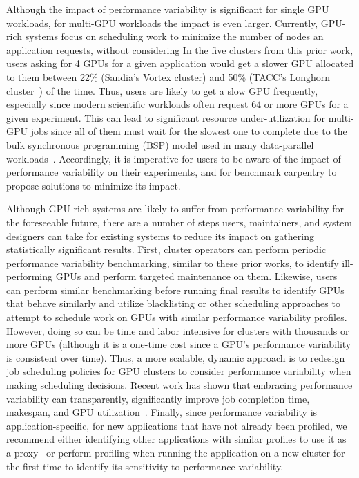 Although the impact of performance variability is significant for single GPU workloads, for multi-GPU workloads the impact is even larger.
Currently, GPU-rich systems focus on scheduling work to minimize the number of nodes an application requests, without considering 
In the five clusters from this prior work, users asking for 4 GPUs for a given application would get a slower GPU allocated to them between 22\% (Sandia's Vortex cluster) and 50\% (TACC's Longhorn cluster~\cite{stanzione2020frontera, tacc}) of the time.
Thus, users are likely to get a slow GPU frequently, especially since modern scientific workloads often request 64 or more GPUs for a given experiment.
This can lead to significant resource under-utilization for multi-GPU jobs since all of them must wait for the slowest one to complete due to the bulk synchronous programming (BSP) model used in many data-parallel workloads~\cite{paszke2017-pytorch}.
Accordingly, it is imperative for users to be aware of the impact of performance variability on their experiments, and for benchmark carpentry to propose solutions to minimize its impact.

Although GPU-rich systems are likely to suffer from performance variability for the foreseeable future, there are a number of steps users, maintainers, and system designers can take for existing systems to reduce its impact on gathering statistically significant results.
First, cluster operators can perform periodic performance variability benchmarking, similar to these prior works, to identify ill-performing GPUs and perform targeted maintenance on them.
Likewise, users can perform similar benchmarking before running final results to identify GPUs that behave similarly and utilize blacklisting or other scheduling approaches to attempt to schedule work on GPUs with similar performance variability profiles.
However, doing so can be time and labor intensive for clusters with thousands or more GPUs (although it is a one-time cost since a GPU's performance variability is consistent over time).
Thus, a more scalable, dynamic approach is to redesign job scheduling policies for GPU clusters to consider performance variability when making scheduling decisions.
Recent work has shown that embracing performance variability can transparently, significantly improve job completion time, makespan, and GPU utilization~\cite{JainTran2024-pal}.
Finally, since performance variability is application-specific, for new applications that have not already been profiled, we recommend either identifying other applications with similar profiles to use it as a proxy~\cite{Guerreiro-appClasses} or perform profiling when running the application on a new cluster for the first time to identify its sensitivity to performance variability.

%